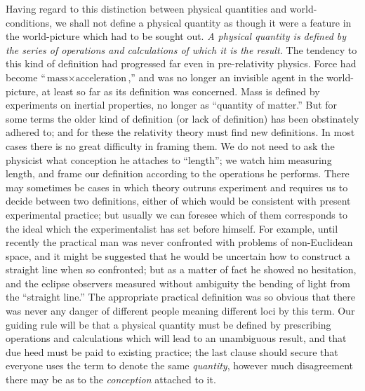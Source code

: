 \documentclass[12pt]{book}
\begin{document}
Having regard to this distinction between physical quantities and world-conditions,
we shall not define a physical quantity as though it were a feature
in the world-picture which had to be sought out. \emph{A physical quantity is
defined by the series of operations and calculations of which it is the result.}
The tendency to this kind of definition had progressed far even in pre-relativity
physics. Force had become ``$\text{mass} \times \text{acceleration}$,'' and was no longer an invisible
agent in the world-picture, at least so far as its definition was concerned.
Mass is defined by experiments on inertial properties, no longer as ``quantity
of matter.'' But for some terms the older kind of definition (or lack of
definition) has been obstinately adhered to; and for these the relativity
theory must find new definitions. In most cases there is no great difficulty
in framing them. We do not need to ask the physicist what conception
he attaches to ``length''; we watch him measuring length, and frame our
definition according to the operations he performs. There may sometimes be
cases in which theory outruns experiment and requires us to decide between
two definitions, either of which would be consistent with present experimental
practice; but usually we can foresee which of them corresponds to the ideal
which the experimentalist has set before himself. For example, until recently
the practical man was never confronted with problems of non-Euclidean space,
and it might be suggested that he would be uncertain how to construct a
straight line when so confronted; but as a matter of fact he showed no
hesitation, and the eclipse observers measured without ambiguity the bending
of light from the ``straight line.'' The appropriate practical definition was so
obvious that there was never any danger of different people meaning different
loci by this term. Our guiding rule will be that a physical quantity must be
defined by prescribing operations and calculations which will lead to an
unambiguous result, and that due heed must be paid to existing practice;
the last clause should secure that everyone uses the term to denote the same
\emph{quantity}, however much disagreement there may be as to the \emph{conception}
attached to it.
\end{document}

